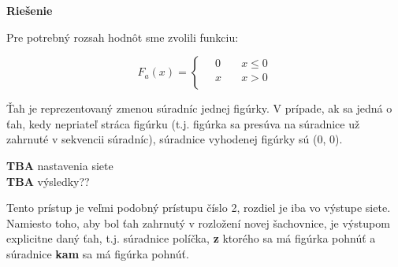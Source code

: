 \documentclass[12pt]{article}
\newcommand{\mysmallsection}[1]{\vspace{0.5cm}{\centering\large\textbf{#1}\\}\normalsize\vspace{0.5cm}}
\begin{document}
{\centering\textbf{Riešenie}\\}

Pre potrebný rozsah hodnôt sme zvolili funkciu:

\[ F_a(x) =
  \begin{cases}
    \quad 0  & \quad x \leq 0 \\
    \quad x  & \quad x > 0\\
  \end{cases}
\]

Ťah je reprezentovaný zmenou súradníc jednej figúrky. V prípade, ak sa jedná o ťah, kedy nepriateľ stráca figúrku (t.j. figúrka sa presúva na súradnice už zahrnuté v sekvencii súradníc), súradnice vyhodenej figúrky sú (0, 0).

\textbf{TBA} nastavenia siete\\
\textbf{TBA} výsledky??

\mysmallsection{Prístup 3}

Tento prístup je veľmi podobný prístupu číslo 2, rozdiel je iba vo výstupe siete. Namiesto toho, aby bol ťah zahrnutý v rozložení novej šachovnice, je výstupom explicitne daný ťah, t.j. súradnice políčka, \textbf{z} ktorého sa má figúrka pohnúť a súradnice \textbf{kam} sa má figúrka pohnúť.
\end{document}
